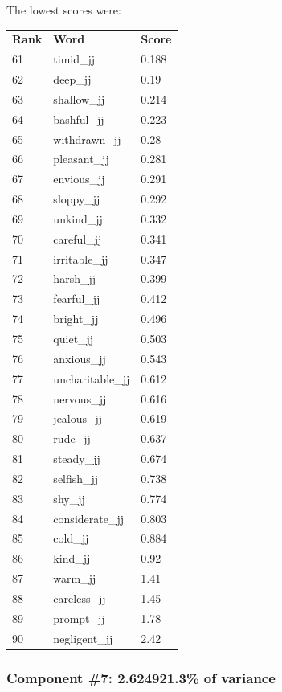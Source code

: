 \documentclass[10pt,letterpaper]{book}
\begin{document}
The lowest scores were:
\begin{tabular}{ l l l }
        \textbf{Rank} & \textbf{Word} & \textbf{Score} \\
        61 & timid\_jj & 0.188 \\
        62 & deep\_jj & 0.19 \\
        63 & shallow\_jj & 0.214 \\
        64 & bashful\_jj & 0.223 \\
        65 & withdrawn\_jj & 0.28 \\
        66 & pleasant\_jj & 0.281 \\
        67 & envious\_jj & 0.291 \\
        68 & sloppy\_jj & 0.292 \\
        69 & unkind\_jj & 0.332 \\
        70 & careful\_jj & 0.341 \\
        71 & irritable\_jj & 0.347 \\
        72 & harsh\_jj & 0.399 \\
        73 & fearful\_jj & 0.412 \\
        74 & bright\_jj & 0.496 \\
        75 & quiet\_jj & 0.503 \\
        76 & anxious\_jj & 0.543 \\
        77 & uncharitable\_jj & 0.612 \\
        78 & nervous\_jj & 0.616 \\
        79 & jealous\_jj & 0.619 \\
        80 & rude\_jj & 0.637 \\
        81 & steady\_jj & 0.674 \\
        82 & selfish\_jj & 0.738 \\
        83 & shy\_jj & 0.774 \\
        84 & considerate\_jj & 0.803 \\
        85 & cold\_jj & 0.884 \\
        86 & kind\_jj & 0.92 \\
        87 & warm\_jj & 1.41 \\
        88 & careless\_jj & 1.45 \\
        89 & prompt\_jj & 1.78 \\
        90 & negligent\_jj & 2.42 \\
\end{tabular}
\subsubsection{Component \#7: 2.624921.3\% of variance}
\end{document}
